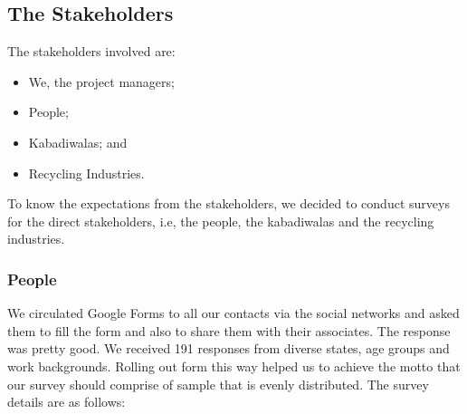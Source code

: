 \documentclass{article}
\begin{document}
\subsection{The Stakeholders}
\par The stakeholders involved are:
\begin{itemize}
    \item We, the project managers;
    \item People;
    \item Kabadiwalas; and
    \item Recycling Industries.
\end{itemize}

\par To know the expectations from the stakeholders, we decided to conduct surveys for the direct stakeholders, i.e, the people, the kabadiwalas and the recycling industries.

\subsubsection{People}
\par  We circulated Google Forms to all our contacts via the social networks and asked them to fill the form and also to share them with their associates. The response was pretty good. We received 191 responses from diverse states, age groups and work backgrounds. Rolling out form this way helped us to achieve the motto that our survey should comprise of sample that is evenly distributed. The survey details are as follows:
 
\end{document}
